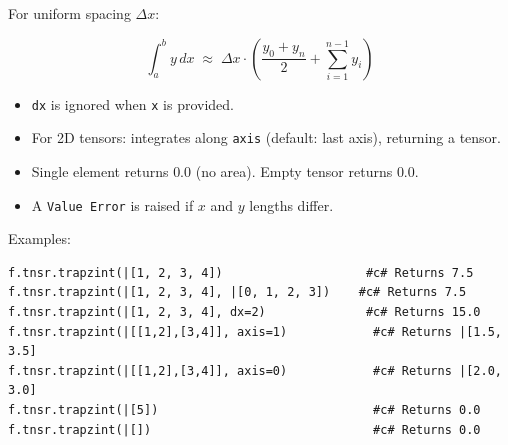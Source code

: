 For uniform spacing $\Delta x$:

\begin{equation}
\int_a^b y \, dx \;\approx\; \Delta x \cdot \left( \frac{y_0 + y_n}{2} + \sum_{i=1}^{n-1} y_i \right)
\label{eq:trapz-uniform}
\end{equation}

\begin{itemize}
\item \texttt{dx} is ignored when \texttt{x} is provided.
\item For 2D tensors: integrates along \texttt{axis} (default: last axis), returning a tensor.
\item Single element returns $0.0$ (no area). Empty tensor returns $0.0$.
\item A \texttt{Value Error} is raised if $x$ and $y$ lengths differ.
\end{itemize}
Examples:
\begin{verbatim}
f.tnsr.trapzint(|[1, 2, 3, 4])                    #c# Returns 7.5
f.tnsr.trapzint(|[1, 2, 3, 4], |[0, 1, 2, 3])    #c# Returns 7.5
f.tnsr.trapzint(|[1, 2, 3, 4], dx=2)              #c# Returns 15.0
f.tnsr.trapzint(|[[1,2],[3,4]], axis=1)            #c# Returns |[1.5, 3.5]
f.tnsr.trapzint(|[[1,2],[3,4]], axis=0)            #c# Returns |[2.0, 3.0]
f.tnsr.trapzint(|[5])                              #c# Returns 0.0
f.tnsr.trapzint(|[])                               #c# Returns 0.0
\end{verbatim}

